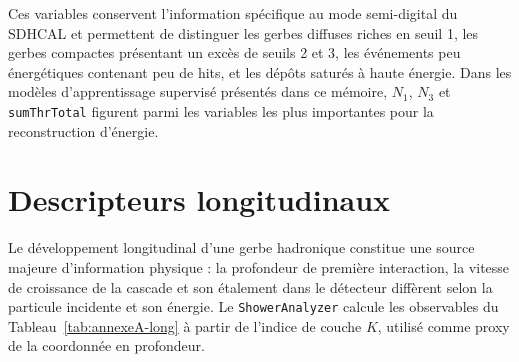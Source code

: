 Ces variables conservent l'information spécifique au mode semi-digital du SDHCAL et permettent de
distinguer les gerbes diffuses riches en seuil 1, les gerbes compactes présentant un excès de seuils
2 et 3, les événements peu énergétiques contenant peu de hits, et les dépôts saturés à haute
énergie. Dans les modèles d'apprentissage supervisé présentés dans ce mémoire, \(N_1\), \(N_3\) et
\texttt{sumThrTotal} figurent parmi les variables les plus importantes pour la reconstruction
d'énergie.

\section{Descripteurs longitudinaux}
\label{annexe:longitudinal}

Le développement longitudinal d'une gerbe hadronique constitue une source majeure d'information
physique : la profondeur de première interaction, la vitesse de croissance de la cascade et son
étalement dans le détecteur diffèrent selon la particule incidente et son énergie. Le
\texttt{ShowerAnalyzer} calcule les observables du Tableau~\ref{tab:annexeA-long} à partir de
l'indice de couche \(K\), utilisé comme proxy de la coordonnée en profondeur.

